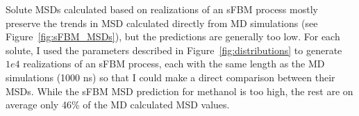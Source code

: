 \documentclass{article}
\begin{document}
  
  Solute MSDs calculated based on realizations of an sFBM process mostly
  preserve the trends in MSD calculated directly from MD simulations (see
  Figure~\ref{fig:sFBM_MSDs}), but the predictions are generally too low. 
  For each solute, I used the parameters described in Figure~\ref{fig:distributions}
  to generate $1e4$ realizations of an sFBM process, each with the same
  length as the MD simulations (1000 ns) so that I could make a direct 
  comparison between their MSDs. While the sFBM MSD prediction for methanol
  is too high, the rest are on average only 46\% of the MD calculated MSD
  values. 
  
  
\end{document}
